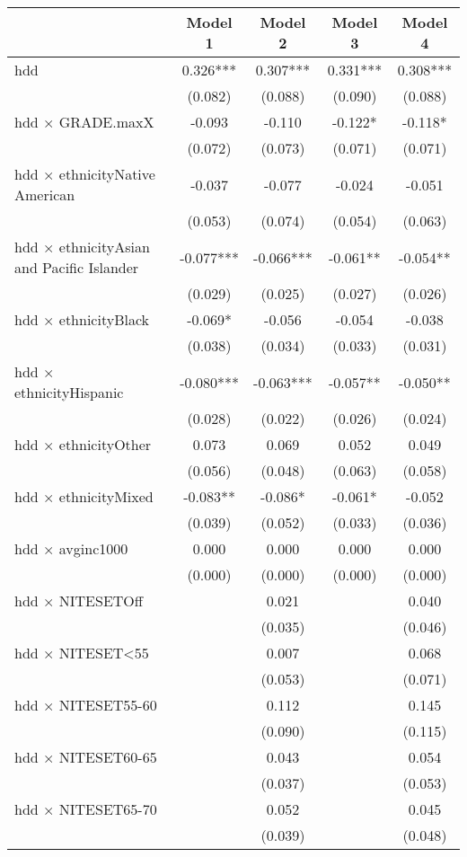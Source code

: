 \documentclass[
]{article}
\begin{document}
\begin{table}[H]
\centering
\begin{tabular}[t]{lcccc}
\toprule
  & Model 1 & Model 2 & Model 3 & Model 4\\
\midrule
hdd & 0.326*** & 0.307*** & 0.331*** & 0.308***\\
 & (0.082) & (0.088) & (0.090) & (0.088)\\
hdd × GRADE.maxX & -0.093 & -0.110 & -0.122* & -0.118*\\
 & (0.072) & (0.073) & (0.071) & (0.071)\\
hdd × ethnicityNative American & -0.037 & -0.077 & -0.024 & -0.051\\
 & (0.053) & (0.074) & (0.054) & (0.063)\\
hdd × ethnicityAsian and Pacific Islander & -0.077*** & -0.066*** & -0.061** & -0.054**\\
 & (0.029) & (0.025) & (0.027) & (0.026)\\
hdd × ethnicityBlack & -0.069* & -0.056 & -0.054 & -0.038\\
 & (0.038) & (0.034) & (0.033) & (0.031)\\
hdd × ethnicityHispanic & -0.080*** & -0.063*** & -0.057** & -0.050**\\
 & (0.028) & (0.022) & (0.026) & (0.024)\\
hdd × ethnicityOther & 0.073 & 0.069 & 0.052 & 0.049\\
 & (0.056) & (0.048) & (0.063) & (0.058)\\
hdd × ethnicityMixed & -0.083** & -0.086* & -0.061* & -0.052\\
 & (0.039) & (0.052) & (0.033) & (0.036)\\
hdd × avginc1000 & 0.000 & 0.000 & 0.000 & 0.000\\
 & (0.000) & (0.000) & (0.000) & (0.000)\\
hdd × NITESETOff &  & 0.021 &  & 0.040\\
 &  & (0.035) &  & (0.046)\\
hdd × NITESET<55 &  & 0.007 &  & 0.068\\
 &  & (0.053) &  & (0.071)\\
hdd × NITESET55-60 &  & 0.112 &  & 0.145\\
 &  & (0.090) &  & (0.115)\\
hdd × NITESET60-65 &  & 0.043 &  & 0.054\\
 &  & (0.037) &  & (0.053)\\
hdd × NITESET65-70 &  & 0.052 &  & 0.045\\
 &  & (0.039) &  & (0.048)\\

\end{tabular}
\end{table}
\end{document}
